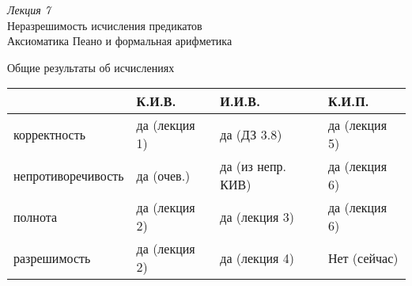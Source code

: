 \documentclass[aspectratio=169]{beamer}
\begin{document}
\begin{frame}
\begin{center}\Large {\it Лекция 7}\\\vspace{0.5cm}
Неразрешимость исчисления предикатов\\
Аксиоматика Пеано и формальная арифметика
\end{center}
\end{frame}

\begin{frame}{Общие результаты об исчислениях}
\begin{tabular}{llll}
      & К.И.В. & И.И.В. & К.И.П.\\\hline
корректность & да (лекция 1) & да (ДЗ 3.8) & да (лекция 5)\\
непротиворечивость & да (очев.) & да (из непр. КИВ) & да (лекция 6)\\
полнота & да (лекция 2) & да (лекция 3) & да (лекция 6)\\
разрешимость & да (лекция 2) & да (лекция 4) & \pause\color{red}Нет (сейчас)
\end{tabular}
\end{frame}

\begin{comment}
\begin{frame}{Полнота ИП доказывается от противного}
Попробуем построить алгоритм по доказательству --- как это делали для теоремы о полноте ИВ.
\begin{enumerate}
\item Раз $\{\neg\varphi\}$ непротиворечиво, то у него есть модель. 
Как построить эту модель ? Видимо, <<метод Британского музея>>: перебрать все доказуемые формулы. 
\item Если в процессе нашли $\neg\varphi \vdash \alpha \with \neg \alpha$, то $\vdash\varphi$ (способ перестроения --- см. ДЗ VI.3).
\item Если, {\color{olive}перебрав все $\aleph_0$ формул,} противоречия не нашли --- значит, есть модель $\{\neg\varphi\}$, и $\not\vdash\varphi$.
\item Итого: теорема о полноте ИП не поможет найти доказательство.
\end{enumerate}
\end{frame}
\end{comment}
\end{document}
